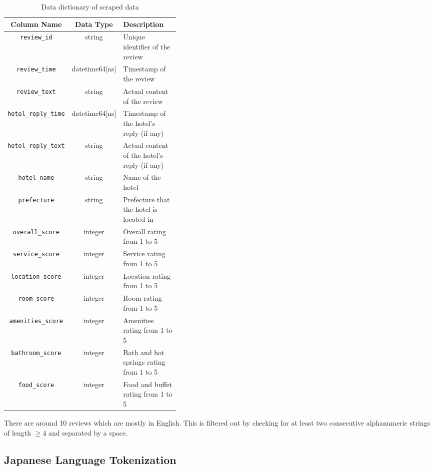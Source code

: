 \documentclass[12pt]{article}
\begin{document}
	\begin{table}
		\begin{center}
			{\renewcommand{\arraystretch}{1.5}
				\renewcommand{\tabcolsep}{0.2cm}
				\begin{tabular}{|c|c|p{0.4\linewidth}|}
					\hline
					Column Name & Data Type & Description\\
					\hline
					\verb*|review_id| & string & Unique identifier of the review\\
					\hline
					\verb*|review_time| & datetime64[ns] & Timestamp of the review\\
					\hline
					\verb*|review_text| & string & Actual content of the review\\
					\hline
					\verb*|hotel_reply_time| & datetime64[ns] & Timestamp of the hotel's reply (if any)\\
					\hline
					\verb*|hotel_reply_text| & string & Actual content of the hotel's reply (if any)\\
					\hline
					\verb*|hotel_name| & string & Name of the hotel\\
					\hline
					\verb*|prefecture| & string & Prefecture that the hotel is located in\\
					\hline
					\verb*|overall_score| & integer & Overall rating from 1 to 5\\
					\hline
					\verb*|service_score| & integer & Service rating from 1 to 5\\
					\hline
					\verb*|location_score| & integer & Location rating from 1 to 5\\
					\hline
					\verb*|room_score| & integer & Room rating from 1 to 5\\
					\hline
					\verb*|amenities_score| & integer & Amenities rating from 1 to 5\\
					\hline
					\verb*|bathroom_score| & integer & Bath and hot springs rating from 1 to 5\\
					\hline
					\verb*|food_score| & integer & Food and buffet rating from 1 to 5\\
					\hline
			\end{tabular}}
		\end{center}
		\caption{Data dictionary of scraped data}
	\end{table}
	
	There are around 10 reviews which are mostly in English. This is filtered out by checking for at least two consecutive alphanumeric strings of length $\geq4$ and separated by a space.
	
	\subsection{Japanese Language Tokenization}
	
\end{document}
